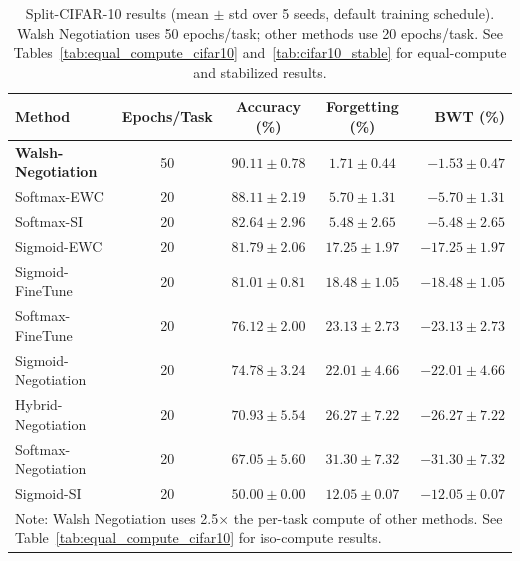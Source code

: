 \documentclass[preprint,review,12pt]{elsarticle}
\begin{document}
\begin{table}[t]
\centering
\caption{Split-CIFAR-10 results (mean $\pm$ std over 5 seeds, default training schedule). Walsh Negotiation uses 50 epochs/task; other methods use 20 epochs/task. See Tables~\ref{tab:equal_compute_cifar10} and~\ref{tab:cifar10_stable} for equal-compute and stabilized results.}
\label{tab:cifar10_multiseed}
\begin{tabular}{lcccr}
\toprule
Method & Epochs/Task & Accuracy (\%) & Forgetting (\%) & BWT (\%) \\
\midrule
\textbf{Walsh-Negotiation} & 50 & $\mathbf{90.11 \pm 0.78}$ & $\mathbf{1.71 \pm 0.44}$ & $\mathbf{-1.53 \pm 0.47}$ \\
Softmax-EWC & 20 & $88.11 \pm 2.19$ & $5.70 \pm 1.31$ & $-5.70 \pm 1.31$ \\
Softmax-SI & 20 & $82.64 \pm 2.96$ & $5.48 \pm 2.65$ & $-5.48 \pm 2.65$ \\
Sigmoid-EWC & 20 & $81.79 \pm 2.06$ & $17.25 \pm 1.97$ & $-17.25 \pm 1.97$ \\
Sigmoid-FineTune & 20 & $81.01 \pm 0.81$ & $18.48 \pm 1.05$ & $-18.48 \pm 1.05$ \\
Softmax-FineTune & 20 & $76.12 \pm 2.00$ & $23.13 \pm 2.73$ & $-23.13 \pm 2.73$ \\
Sigmoid-Negotiation & 20 & $74.78 \pm 3.24$ & $22.01 \pm 4.66$ & $-22.01 \pm 4.66$ \\
Hybrid-Negotiation & 20 & $70.93 \pm 5.54$ & $26.27 \pm 7.22$ & $-26.27 \pm 7.22$ \\
Softmax-Negotiation & 20 & $67.05 \pm 5.60$ & $31.30 \pm 7.32$ & $-31.30 \pm 7.32$ \\
Sigmoid-SI & 20 & $50.00 \pm 0.00$ & $12.05 \pm 0.07$ & $-12.05 \pm 0.07$ \\
\bottomrule
\multicolumn{5}{l}{\scriptsize Note: Walsh Negotiation uses 2.5$\times$ the per-task compute of other methods. See Table~\ref{tab:equal_compute_cifar10} for iso-compute results.}
\end{tabular}
\end{table}
\end{document}

